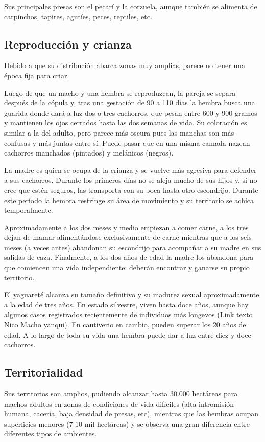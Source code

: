     Sus principales presas son el pecarí y la corzuela, aunque también se alimenta de carpinchos, tapires, agutíes, peces, reptiles, etc.
    
    \subsection{Reproducción y crianza}
    Debido a que su distribución abarca zonas muy amplias, parece no tener una época fija para criar.
    
    Luego de que un macho y una hembra se reproduzcan, la pareja se separa después de la cópula y, tras una gestación de 90 a 110 días la hembra busca una guarida donde dará a luz dos o tres cachorros, que pesan entre 600 y 900 gramos y mantienen los ojos cerrados hasta las dos semanas de vida. Su coloración es similar a la del adulto, pero parece más oscura pues las manchas son más confusas y más juntas entre sí. Puede pasar que en una misma camada nazcan cachorros manchados (pintados) y melánicos (negros).
    
    La madre es quien se ocupa de la crianza y se vuelve más agresiva para defender a sus cachorros. Durante los primeros días no se aleja mucho de sus hijos y, si no cree que estén seguros, las transporta con su boca hasta otro escondrijo. Durante este período la hembra restringe su área de movimiento y su territorio se achica temporalmente.
    
    Aproximadamente a los dos meses y medio empiezan a comer carne, a los tres dejan de mamar alimentándose exclusivamente de carne mientras que a los seis meses (a veces antes) abandonan su escondrijo para acompañar a su madre en sus salidas de caza. Finalmente, a los dos años de edad la madre los abandona para que comiencen una vida independiente: deberán encontrar y ganarse su propio territorio.
    
    El yaguareté alcanza su tamaño definitivo y su madurez sexual aproximadamente a la edad de tres años. En estado silvestre, viven hasta doce años, aunque hay algunos casos registrados recientemente de individuos más longevos (Link texto Nico Macho yanqui). En cautiverio en cambio, pueden superar los 20 años de edad. A lo largo de toda su vida una hembra puede dar a luz entre diez y doce cachorros.

    \subsection{Territorialidad}
    Sus territorios son amplios, pudiendo alcanzar hasta 30.000 hectáreas para machos adultos en zonas de condiciones de vida difíciles (alta intromisión humana, cacería, baja densidad de presas, etc), mientras que las hembras ocupan superficies menores (7-10 mil hectáreas) y se observa una gran diferencia entre diferentes tipos de ambientes.
    
